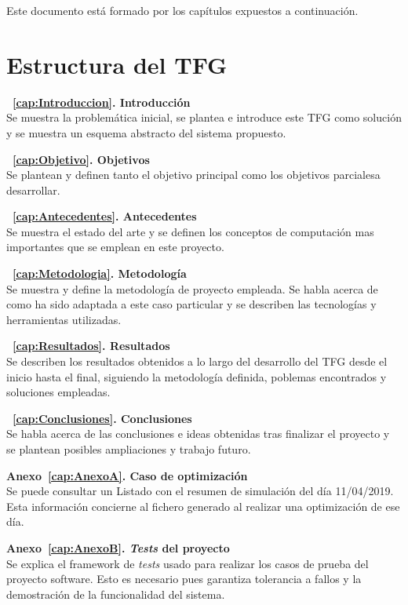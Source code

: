 Este documento está formado por los capítulos expuestos a continuación.

\section{Estructura del TFG}
\begin{description}
\item \textbf{~\ref{cap:Introduccion}. Introducción}\\
  Se muestra la problemática inicial, se plantea e introduce este \gls{TFG} como solución y se muestra un esquema abstracto del sistema propuesto.
\item \textbf{~\ref{cap:Objetivo}. Objetivos}\\
  Se plantean y definen tanto el objetivo principal como los objetivos parcialesa desarrollar.
\item \textbf{~\ref{cap:Antecedentes}. Antecedentes}\\
  Se muestra el estado del arte y se definen los conceptos de computación mas importantes que se emplean en este proyecto.
\item \textbf{~\ref{cap:Metodologia}. Metodología}\\
  Se muestra y define la metodología de proyecto empleada. Se habla acerca de como ha sido adaptada a este caso particular y se describen las tecnologías y herramientas utilizadas.
\item \textbf{~\ref{cap:Resultados}. Resultados}\\
  Se describen los resultados obtenidos a lo largo del desarrollo del \gls{TFG} desde el inicio hasta el final, siguiendo la metodología definida, poblemas encontrados y soluciones empleadas.
\item \textbf{~\ref{cap:Conclusiones}. Conclusiones}\\
  Se habla acerca de las conclusiones e ideas obtenidas tras finalizar el proyecto y se plantean posibles ampliaciones y trabajo futuro.
\item \textbf{Anexo~\ref{cap:AnexoA}. Caso de optimización}\\
  Se puede consultar un Listado con el resumen de simulación del día 11/04/2019. Esta información concierne al fichero generado al realizar una optimización de ese día.
\item \textbf{Anexo~\ref{cap:AnexoB}. \textit{Tests} del proyecto}\\
  Se explica el framework de \textit{tests} usado para realizar los casos de prueba del proyecto software. Esto es necesario pues garantiza tolerancia a fallos y la demostración de la funcionalidad del sistema.
\end{description}
